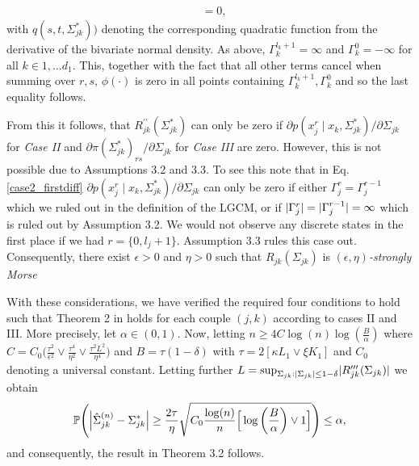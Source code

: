 \begin{condition}
\begin{condition}
\begin{align*}
             & = 0,
        \end{align*}
        with $q(s,t,\Sigma_{jk}^*))$ denoting the corresponding quadratic function from the derivative of the bivariate normal density. As above, $\Gamma_k^{l_k+1} = \infty$ and $\Gamma_k^0 = -\infty$ for all $k \in 1, \dots d_1$. This, together with the fact that all other terms cancel when summing over $r,s$, $\phi(\cdot)$ is zero in all points containing $\Gamma_k^{l_k+1}, \Gamma_k^0$ and so the last equality follows.

        From this it follows, that $R_{jk}^{\prime\prime}(\Sigma_{jk}^*)$ can only be zero if $\partial p(x_j^{r} \mid x_{k}, \Sigma_{jk}^*) / \partial \Sigma_{jk}$ for \textit{Case II} and $\partial \pi(\Sigma_{jk}^*)_{rs}/\partial \Sigma_{jk}$ for \textit{Case III} are zero. However, this is not possible due to Assumptions 3.2 and 3.3.
        To see this note that in Eq. \eqref{case2_firstdiff} $\partial p(x_j^{r} \mid x_{k}, \Sigma_{jk}^*) / \partial \Sigma_{jk}$ can only be zero if either ${\Gamma}^r_j = {\Gamma}^{r-1}_j$ which we ruled out in the definition of the LGCM, or if $\lvert{\Gamma}^r_j\rvert = \lvert{\Gamma}^{r-1}_j\rvert = \infty$ which is ruled out by Assumption 3.2.
        We would not observe any discrete states in the first place if we had $r=\{0,l_{j}+1\}$. Assumption 3.3
        rules this case out.
        Consequently, there exist $\epsilon > 0$ and $\eta > 0$ such that $R_{jk}(\Sigma_{jk})$ is $(\epsilon,\eta)$\textit{-strongly Morse}
    \end{condition}
\end{condition}

With these considerations, we have verified the required four conditions to hold such that Theorem 2 in \cite{Mei18} %
holds for each couple $(j,k)$ according to cases II and III. More precisely, let $\alpha \in (0,1)$. Now, letting  $n \geq 4 C \log(n) \log(\frac{B}{\alpha})$
where $C = C_0 \Big(\frac{\tau^2}{\epsilon^2} \vee \frac{\tau^4}{\eta^2} \vee \frac{\tau^2L^2}{\eta^4} \Big)$ and $B = \tau(1-\delta)$
with $\tau = 2 [\kappa L_1 \vee \xi K_1]$  and $C_0$ denoting a universal constant. Letting further $L = \sup_{\Sigma_{jk}: \lvert\Sigma_{jk}\rvert \leq 1- \delta} \lvert R_{jk}^{\prime\prime\prime}(\Sigma_{jk})\rvert$ we obtain
\begin{equation}\label{individual_bound}
    \mathbb{P}\Bigg( \abs{\hat{\Sigma}^{(n)}_{jk} - \Sigma_{jk}^*} \geq \frac{2\tau}{\eta}\sqrt{C_0\frac{\log(n)}{n}\Big[\log\bigg(\frac{B}{\alpha}\bigg) \vee 1\Big] } \Bigg) \leq \alpha,
\end{equation}
and consequently, the result in Theorem 3.2
follows.


